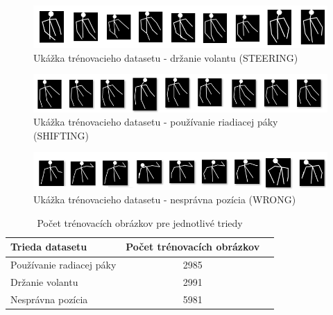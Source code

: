\documentclass[slovak,master,dept460,male,cpp,cpdeclaration]{diploma}
\begin{document}
\begin{figure}[H]
	\centering
	\includegraphics[width=1\textwidth]{Figures/NNsteering.png}
	\caption{Ukážka trénovacieho datasetu - držanie volantu (STEERING)}
	\label{fig:NNSteering}
\end{figure}

\begin{figure}[H]
	\centering
	\includegraphics[width=1\textwidth]{Figures/NNShifting.png}
	\caption{Ukážka trénovacieho datasetu - používanie riadiacej páky (SHIFTING)}
	\label{fig:NNShifting}
\end{figure}

\begin{figure}[H]
	\centering
	\includegraphics[width=1\textwidth]{Figures/NNWrong.png}
	\caption{Ukážka trénovacieho datasetu - nesprávna pozícia (WRONG)}
	\label{fig:NNWrong}
\end{figure}

\begin{table}[H]
\centering
\begin{tabular}{|l|c|c|}
\hline
\textbf{Trieda datasetu}        & \textbf{Počet trénovacích obrázkov} \\ \hline
Používanie radiacej páky        &  2985       \\ \hline
Držanie volantu    &  2991    \\ \hline
Nesprávna pozícia       &  5981    \\ \hline
\end{tabular}
	\caption{Počet trénovacích obrázkov pre jednotlivé triedy}
	\label{tab:nn}
\end{table}
\end{document}
